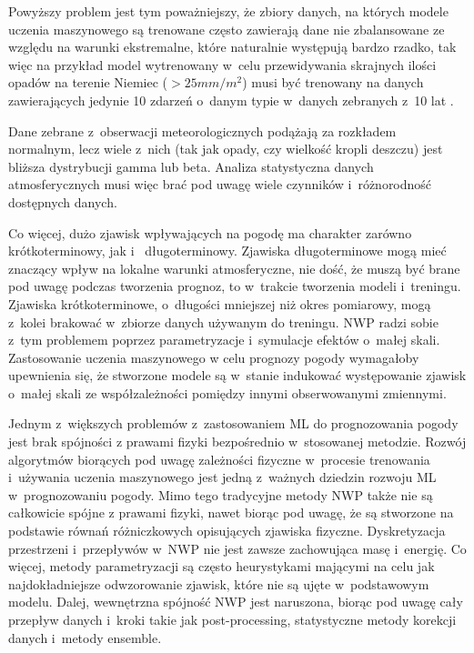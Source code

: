 Powyższy problem jest tym poważniejszy, że zbiory danych, na których modele uczenia maszynowego
są trenowane często zawierają dane nie zbalansowane ze względu na warunki ekstremalne, które naturalnie
występują bardzo rzadko, tak więc na przykład model wytrenowany w~celu przewidywania
skrajnych ilości opadów na terenie Niemiec ($> 25mm/m^2$) musi być trenowany na danych 
zawierających jedynie 10 zdarzeń o~danym typie w~danych zebranych z~10 lat \cite{can-dl-beat-numerical}.

Dane zebrane z~obserwacji meteorologicznych podążają za
rozkładem normalnym, lecz wiele z~nich (tak jak opady, czy wielkość kropli deszczu) 
\cite{can-dl-beat-numerical} jest bliższa dystrybucji gamma lub beta. Analiza statystyczna
danych atmosferycznych musi więc brać pod uwagę wiele czynników i~różnorodność dostępnych danych.

Co więcej, dużo zjawisk wpływających na pogodę ma charakter zarówno krótkoterminowy, jak i~
długoterminowy. Zjawiska długoterminowe mogą mieć znaczący wpływ na lokalne warunki atmosferyczne,
nie dość, że muszą być brane pod uwagę podczas tworzenia prognoz, to w~trakcie tworzenia modeli
i~treningu. Zjawiska krótkoterminowe, o~długości mniejszej niż okres pomiarowy, mogą z~kolei
brakować w~zbiorze danych używanym do treningu. NWP radzi sobie z~tym problemem poprzez 
parametryzacje i~symulacje efektów o~małej skali. Zastosowanie uczenia maszynowego
w celu prognozy pogody wymagałoby upewnienia się, że stworzone modele są w~stanie 
indukować występowanie zjawisk o~małej skali ze współzależności pomiędzy innymi obserwowanymi 
zmiennymi.

Jednym z~większych problemów z~zastosowaniem ML do prognozowania pogody jest brak spójności
z prawami fizyki bezpośrednio w~stosowanej metodzie. Rozwój algorytmów biorących pod uwagę
zależności fizyczne w~procesie trenowania i~używania uczenia maszynowego jest jedną z~ważnych dziedzin
rozwoju ML w~prognozowaniu pogody. Mimo tego tradycyjne metody NWP także nie są całkowicie spójne
z prawami fizyki, nawet biorąc pod uwagę, że są stworzone na podstawie równań różniczkowych
opisujących zjawiska fizyczne. Dyskretyzacja przestrzeni i~przepływów w~NWP nie jest zawsze 
zachowująca masę i~energię. Co więcej, metody parametryzacji są często heurystykami 
mającymi na celu jak najdokładniejsze odwzorowanie zjawisk, które nie są ujęte w~podstawowym modelu.
Dalej, wewnętrzna spójność NWP jest naruszona, biorąc pod uwagę cały przepływ
danych i~kroki takie jak post-processing, statystyczne metody korekcji danych i~metody 
ensemble.

